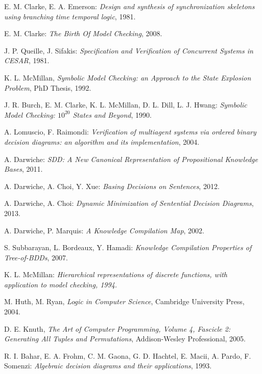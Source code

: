 \documentclass[11pt]{report}
\begin{document}
\begin{thebibliography}{9}

 E. M. Clarke, E. A. Emerson: \textit{Design and synthesis of synchronization skeletons using branching time temporal logic}, 1981.

 E. M. Clarke: \textit{The Birth Of Model Checking}, 2008.

 J. P. Queille, J. Sifakis: \textit{Specification and Verification of Concurrent Systems in CESAR}, 1981.

 K. L. McMillan, \textit{Symbolic Model Checking: an Approach to the State Explosion Problem}, PhD Thesis, 1992. 

 J. R. Burch, E. M. Clarke, K. L. McMillan, D. L. Dill, L. J. Hwang: \textit{Symbolic Model Checking: $\textit{10}^{\textit{20}}$ States and Beyond}, 1990.

 A. Lomuscio, F. Raimondi: \textit{Verification of multiagent systems via ordered binary decision diagrams: an algorithm and its implementation}, 2004. 

A. Darwiche:\emph{ SDD: A New Canonical Representation of Propositional Knowledge Bases}, 2011.

A. Darwiche, A. Choi, Y. Xue: \emph{Basing Decisions on Sentences}, 2012.

A. Darwiche, A. Choi: \textit{Dynamic Minimization of Sentential Decision Diagrams}, 2013.

  A. Darwiche, P. Marquis:
  \emph{A Knowledge Compilation Map}, 2002.

S. Subbarayan, L. Bordeaux, Y. Hamadi:\textit{
Knowledge Compilation Properties of Tree-of-BDDs}, 2007.

K. L. McMillan:\textit{ Hierarchical representations of discrete functions, with application to model checking, 1994.
}

 M. Huth, M. Ryan, 
\emph{Logic in Computer Science},
Cambridge University Press, 2004.

 D. E. Knuth, \textit{The Art of Computer Programming, Volume
4, Fascicle 2: Generating All Tuples and Permutations}, Addison-Wesley Professional, 2005.

  R. I. Bahar, E. A. Frohm, C. M. Gaona, G. D. Hachtel, E. Macii, A. Pardo, F. Somenzi:\textit{
Algebraic decision diagrams and their applications}, 1993.


\end{thebibliography}
\end{document}
